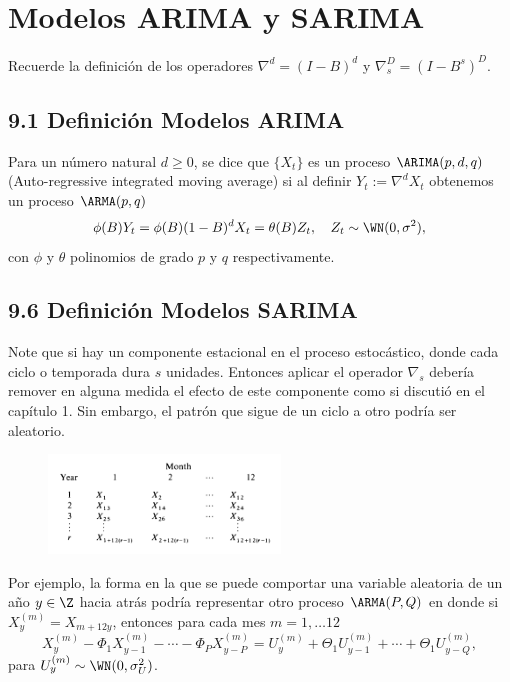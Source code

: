 
\section{Modelos ARIMA y SARIMA}

Recuerde la definición de los operadores $\nabla^d = (I-B)^d$ y $\nabla_s^D = (I-B^s)^D$.

\subsection*{9.1 Definición Modelos ARIMA}

Para un número natural $d \geq 0$, se dice que $\{X_t\}$ es un proceso $\ARIMA(p,d,q)$ (Auto-regressive integrated moving average) si al definir $Y_t := \nabla^d X_t$ obtenemos un proceso $\ARMA(p,q)$
\[ \phi(B) Y_t = \phi(B)(1-B)^d X_t = \theta(B) Z_t,\quad Z_t \sim \WN(0,\sigma^2), \]
con $\phi$ y $\theta$ polinomios de grado $p$ y $q$ respectivamente.

\subsection*{9.6 Definición Modelos SARIMA}

Note que si hay un componente estacional en el proceso estocástico, donde cada ciclo o temporada dura $s$ unidades. Entonces aplicar el operador $\nabla_s$ debería remover en alguna medida el efecto de este componente como si discutió en el capítulo 1. Sin embargo, el patrón que sigue de un ciclo a otro podría ser aleatorio.

\begin{figure}[H]
    \centering
    \includegraphics[width=0.55\textwidth]{../pictures/image5.png}
\end{figure}

Por ejemplo, la forma en la que se puede comportar una variable aleatoria de un año $y \in \Z$ hacia atrás podría representar otro proceso $\ARMA(P,Q)$ en donde si $X_{y}^{(m)} = X_{m+12y}$, entonces para cada mes $m = 1,\ldots 12$
\[ X_{y}^{(m)} - \Phi_1 X_{y-1}^{(m)} - \cdots - \Phi_{P} X_{y-P}^{(m)} = U_{y}^{(m)} + \Theta_1 U_{y-1}^{(m)} + \cdots + \Theta_1 U_{y-Q}^{(m)}, \]
para $U_{y}^{(m)} \sim \WN(0, \sigma_U^2)$. 

